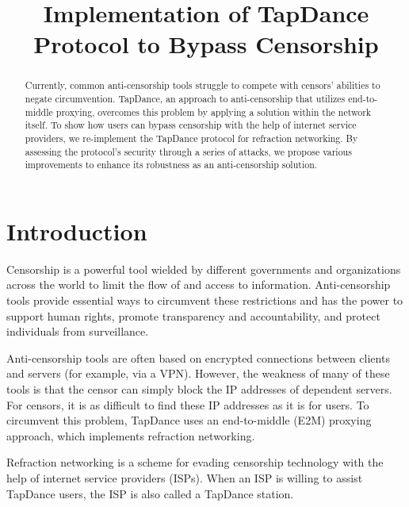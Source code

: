 \documentclass[conference]{IEEEtran}
\begin{document}
\title{Implementation of TapDance Protocol to Bypass Censorship}

\author{
\and
{}
\and
{}
\and
{}
\and
{}
}

\maketitle

\begin{abstract}

Currently, common anti-censorship tools struggle to compete with censors' abilities to negate circumvention. TapDance, an approach to anti-censorship that utilizes end-to-middle proxying, overcomes this problem by applying a solution within the network itself. To show how users can bypass censorship with the help of internet service providers, we re-implement the TapDance protocol for refraction networking. By assessing the protocol's security through a series of attacks, we propose various improvements to enhance its robustness as an anti-censorship solution.

\end{abstract}

\section{Introduction}

Censorship is a powerful tool wielded by different governments and organizations across the world to limit the flow of and access to information. Anti-censorship tools provide essential ways to circumvent these restrictions and has the power to support human rights, promote transparency and accountability, and protect individuals from surveillance.

Anti-censorship tools are often based on encrypted connections between clients and servers (for example, via a VPN). However, the weakness of many of these tools is that the censor can simply block the IP addresses of dependent servers. For censors, it is as difficult to find these IP addresses as it is for users. To circumvent this problem, TapDance uses an end-to-middle (E2M) proxying approach, which implements refraction networking.

Refraction networking is a scheme for evading censorship technology with the help of internet service providers (ISPs). When an ISP is willing to assist TapDance users, the ISP is also called a TapDance station.
\end{document}
